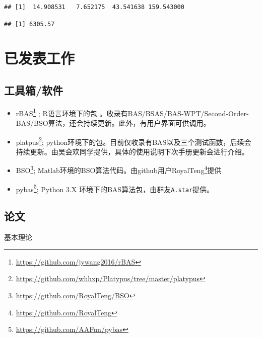 \documentclass[]{ctexbook}
\newenvironment{Shaded}{\begin{snugshade}}{\end{snugshade}}
\newcommand{\OperatorTok}[1]{\textcolor[rgb]{0.81,0.36,0.00}{\textbf{#1}}}
\newcommand{\NormalTok}[1]{#1}
\renewcommand{\href}[2]{#2\footnote{\url{#1}}}
\begin{document}
\begin{verbatim}
## [1]  14.908531   7.652175  43.541638 159.543000
\end{verbatim}

\begin{Shaded}
\end{Shaded}

\begin{verbatim}
## [1] 6305.57
\end{verbatim}

\chapter{已发表工作}\label{paper}

\section{工具箱/软件}

\begin{itemize}
\item
  \href{https://github.com/jywang2016/rBAS}{rBAS} ; R语言环境下的包
  。收录有BAS/BSAS/BAS-WPT/Second-Order-BAS/BSO算法，还会持续更新。此外，有用户界面可供调用。
\item
  \href{https://github.com/whhxp/Platypus/tree/master/platypus}{platpus};
  python环境下的包。目前仅收录有BAS以及三个测试函数，后续会持续更新。由吴会欢同学提供，具体的使用说明下次手册更新会进行介绍。
\item
  \href{https://github.com/RoyalTeng/BSO}{BSO};
  Matlab环境的BSO算法代码。由github用户\href{https://github.com/RoyalTeng}{RoyalTeng}提供
\item
  \href{https://github.com/AAFun/pybas}{pybas}; Python 3.X
  环境下的BAS算法包，由群友\texttt{A.star}提供。
\end{itemize}

\section{论文}

基本理论
\end{document}
